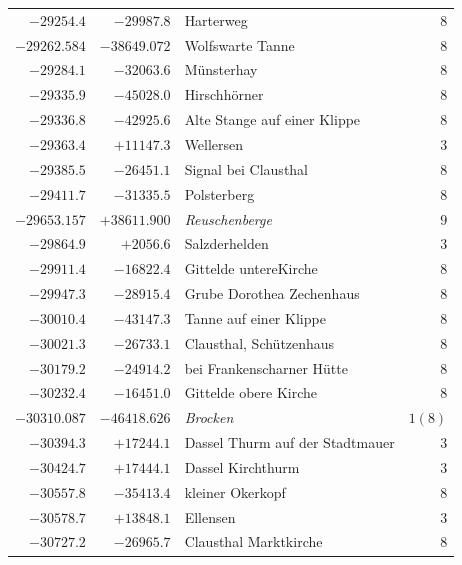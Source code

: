 \begin{center}
\begin{tabular}{r|r|p{170pt}|r}
\(-29254.4\)&\(-29987.8\)&Harterweg&\(8\)\\
\(-29262.584\)&\(-38649.072\)&Wolfswarte Tanne&\(8\)\\
\(-29284.1\)&\(-32063.6\)&Münsterhay&\(8\)\\
\(-29335.9\)&\(-45028.0\)&Hirschhörner&\(8\)\\
\(-29336.8\)&\(-42925.6\)&Alte Stange auf einer Klippe&\(8\)\\
\(-29363.4\)&\(+11147.3\)&Wellersen&\(3\)\\
\(-29385.5\)&\(-26451.1\)&Signal bei Clausthal&\(8\)\\
\(-29411.7\)&\(-31335.5\)&Polsterberg&\(8\)\\
\(-29653.157\)&\(+38611.900\)&\textit{Reuschenberge}&\(9\)\\
\(-29864.9\)&\(+2056.6\)&Salzderhelden&\(3\)\\
\(-29911.4\)&\(-16822.4\)&Gittelde untereKirche&\(8\)\\
\(-29947.3\)&\(-28915.4\)&Grube Dorothea Zechenhaus&\(8\)\\
\(-30010.4\)&\(-43147.3\)&Tanne auf einer Klippe&\(8\)\\
\(-30021.3\)&\(-26733.1\)&Clausthal, Schützenhaus&\(8\)\\
\(-30179.2\)&\(-24914.2\)&bei Frankenscharner Hütte&\(8\)\\
\(-30232.4\)&\(-16451.0\)&Gittelde obere Kirche&\(8\)\\
\(-30310.087\)&\(-46418.626\)&\textit{Brocken}&\(1 (8)\)\\
\(-30394.3\)&\(+17244.1\)&Dassel Thurm auf der Stadtmauer&\(3\)\\
\(-30424.7\)&\(+17444.1\)&Dassel Kirchthurm&\(3\)\\
\(-30557.8\)&\(-35413.4\)&kleiner Okerkopf&\(8\)\\
\(-30578.7\)&\(+13848.1\)&Ellensen&\(3\)\\
\(-30727.2\)&\(-26965.7\)&Clausthal Marktkirche&\(8\)\\
\hline\end{tabular}\endgroup\end{center}
\clearpage
